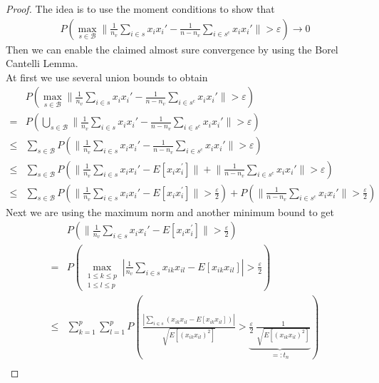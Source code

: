 \documentclass[Research_Module_ES.tex]{subfiles}
\begin{document}
\begin{proof}
 The idea is to use the moment conditions to show that 
 \begin{align}\label{Probabilitie}
 P\left( \max_{s\in \mathcal{B}}\biggl\lVert \frac{1}{n_v}\sum_{i\in s}x_ix_i' - \frac{1}{n-n_v}\sum_{i\in s^c}x_ix_i'\biggr\rVert>\varepsilon\right)\to0
 \end{align}
Then we can enable the claimed almost sure convergence by using the Borel Cantelli Lemma.\\

At first we use several union bounds to obtain
\begin{align}\nonumber
&P\left( \max_{s\in \mathcal{B}}\biggl\lVert \frac{1}{n_v}\sum_{i\in s}x_ix_i' - \frac{1}{n-n_v}\sum_{i\in s^c}x_ix_i'\biggr\rVert>\varepsilon\right)\\\nonumber
=&P\left( \bigcup_{s\in \mathcal{B}}\biggl\lVert \frac{1}{n_v}\sum_{i\in s}x_ix_i' - \frac{1}{n-n_v}\sum_{i\in s^c}x_ix_i'\biggr\rVert>\varepsilon\right)\\\nonumber
\leq&\sum_{s\in \mathcal{B}}P\left(\biggl\lVert \frac{1}{n_v}\sum_{i\in s}x_ix_i' - \frac{1}{n-n_v}\sum_{i\in s^c}x_ix_i'\biggr\rVert>\varepsilon\right)\\\nonumber
\leq&\sum_{s\in \mathcal{B}}P\left(\biggl\lVert \frac{1}{n_v}\sum_{i\in s}x_ix_i'-E[x_i x_i^\prime]\biggr\rVert+\biggl\lVert \frac{1}{n-n_v}\sum_{i\in s^c}x_ix_i'\biggr\rVert>\varepsilon\right)\\
\leq&\sum_{s\in \mathcal{B}}P\left(\biggl\lVert \frac{1}{n_v}\sum_{i\in s}x_ix_i'-E[x_i x_i^\prime]\biggr\rVert>\frac{\varepsilon}{2}\right)+P\left(\biggl\lVert \frac{1}{n-n_v}\sum_{i\in s^c}x_ix_i'\biggr\rVert>\frac{\varepsilon}{2}\right)\label{Viereck}
\end{align}
Next we are using the maximum norm and another minimum bound to get
\begin{align}\nonumber
&P\left(\biggl\lVert \frac{1}{n_v}\sum_{i\in s}x_ix_i'-E[x_i x_i^\prime]\biggr\rVert>\frac{\varepsilon}{2}\right)\\\nonumber
=&P\left(\max_{\substack{1\leq k \leq p \\1\leq l\leq p}}\left| \frac{1}{n_v}\sum_{i\in s}x_{ik}x_{il}-E[x_{ik} x_{il}]\right|>\frac{\varepsilon}{2}\right)\\\nonumber
\leq& \sum_{k=1}^{p}\sum_{l=1}^{p}P\left( \frac{\left|\sum_{i\in s}\left(x_{ik}x_{il}-E[x_{ik}x_{il}]\right)\right|}{\sqrt{E[(x_{ik}x_{il})^2]}}>\underbrace{\frac{\varepsilon}{2}~ \frac{1}{\sqrt{E[(x_{ik}x_{il})^2]}}}_{=:t_n}\right)\\

\end{align}
\end{proof}
\end{document}
